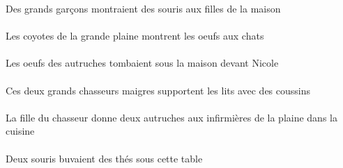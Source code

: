 \begin{exe}
Des grands garçons montraient des souris aux filles de la maison
\ex\gll
\DEFPlErg{}    \DEFSgObl{}   \grandASg{}   \plaineASgObl{}   \DE{}   \coyoteCPlErg{}    \DEFPlDat{}   \chatDPlDat{}   \DEFPlAbs{}   \oeufCPlAbs{}  \montrerVdPrsCPl{}\\
\DEFPlErgP{}    \DEFSgOblP{}   \grandASgP{}   \plaineASgOblP{}   \DEP{}   \coyoteCPlErgP{}    \DEFPlDatP{}   \chatDPlDatP{}   \DEFPlAbsP{}   \oeufCPlAbsP{}  \montrerVdPrsCPlP{}\\
Les coyotes de la grande plaine montrent les oeufs aux chats
\ex\gll
\INDSgObl{}   \NicoleBSgObl{}   \DEVANT{}   \DEFPlAbs{}    \DEFPlObl{}   \autrucheBPlObl{}   \DE{}   \oeufCPlAbs{}    \DEFSgObl{}   \maisonDSgObl{}   \SOUS{}  \tomberViPstCPl{}\\
\INDSgOblP{}   \NicoleBSgOblP{}   \DEVANTP{}   \DEFPlAbsP{}    \DEFPlOblP{}   \autrucheBPlOblP{}   \DEP{}   \oeufCPlAbsP{}    \DEFSgOblP{}   \maisonDSgOblP{}   \SOUSP{}  \tomberViPstCPlP{}\\
Les oeufs des autruches tombaient sous la maison devant Nicole
\ex\gll
\DEMDuErg{}   \grandCDu{}   \maigreCDu{}   \chasseurCDuErg{}    \INDPlObl{}   \coussinBPlObl{}   \AVEC{}   \DEFPlAbs{}   \litDPlAbs{}  \supporterVtPrsDPl{}\\
\DEMDuErgP{}   \grandCDuP{}   \maigreCDuP{}   \chasseurCDuErgP{}    \INDPlOblP{}   \coussinBPlOblP{}   \AVECP{}   \DEFPlAbsP{}   \litDPlAbsP{}  \supporterVtPrsDPlP{}\\
Ces deux grands chasseurs maigres supportent les lits avec des coussins
\ex\gll
\DEFSgObl{}   \cuisineDSgObl{}   \DANS{}   \DEFSgErg{}    \DEFSgObl{}   \chasseurCSgObl{}   \DE{}   \filleCSgErg{}    \DEFPlDat{}    \DEFSgObl{}   \plaineASgObl{}   \DE{}   \infirmiereAPlDat{}   \INDDuAbs{}   \autrucheBDuAbs{}  \donnerVdPrsBDu{}\\
\DEFSgOblP{}   \cuisineDSgOblP{}   \DANSP{}   \DEFSgErgP{}    \DEFSgOblP{}   \chasseurCSgOblP{}   \DEP{}   \filleCSgErgP{}    \DEFPlDatP{}    \DEFSgOblP{}   \plaineASgOblP{}   \DEP{}   \infirmiereAPlDatP{}   \INDDuAbsP{}   \autrucheBDuAbsP{}  \donnerVdPrsBDuP{}\\
La fille du chasseur donne deux autruches aux infirmières de la plaine dans la cuisine
\ex\gll
\DEMSgObl{}   \tableDSgObl{}   \SOUS{}   \INDDuErg{}   \sourisBDuErg{}   \INDPlAbs{}   \theBPlAbs{}  \boireVtPstBPl{}\\
\DEMSgOblP{}   \tableDSgOblP{}   \SOUSP{}   \INDDuErgP{}   \sourisBDuErgP{}   \INDPlAbsP{}   \theBPlAbsP{}  \boireVtPstBPlP{}\\
Deux souris buvaient des thés sous cette table

\end{exe}
